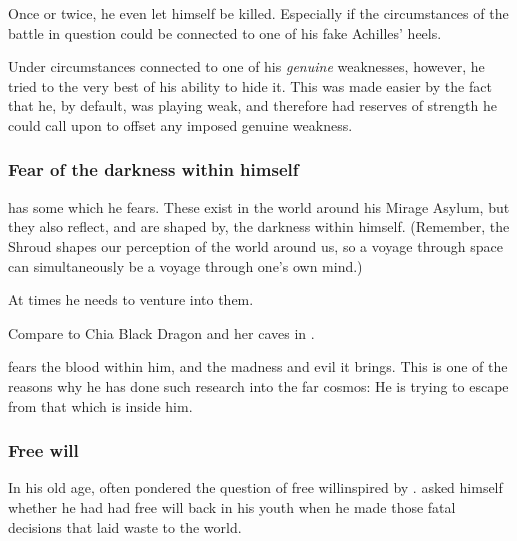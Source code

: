 Once or twice, he even let himself be killed. 
Especially if the circumstances of the battle in question could be connected to one of his fake Achilles' heels. 

Under circumstances connected to one of his \emph{genuine} weaknesses, however, he tried to the very best of his ability to hide it.
This was made easier by the fact that he, by default, was playing weak, and therefore had reserves of strength he could call upon to offset any imposed genuine weakness. 





\subsubsection{Fear of the darkness within himself}
\Ishnaruchaefir{} has some  which he fears. 
These exist in the world around his Mirage Asylum, but they also reflect, and are shaped by, the darkness within himself. 
(Remember, the Shroud shapes our perception of the world around us, so a voyage through space can simultaneously be a voyage through one's own mind.) 

At times he needs to venture into them. 

Compare to Chia Black Dragon and her caves in \cite[p.120-150]{StephenMarley:ShadowSisters}. 

\Ishnaruchaefir{} fears the \xsic{} blood within him, and the madness and evil it brings. 
This is one of the reasons why he has done such research into the far cosmos: 
He is trying to escape from that which is inside him.






\subsubsection{Free will}
In his old age, \Iscrafel often pondered the question of free will\dash inspired by .
\Iscrafel asked himself whether he had had free will back in his youth when he made those fatal decisions that laid waste to the world. 





